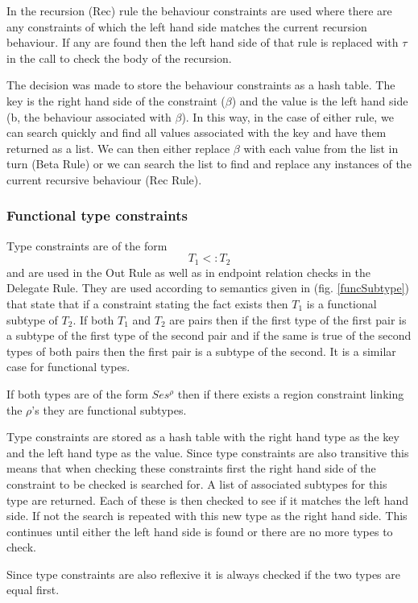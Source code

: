 In the recursion (Rec) rule the behaviour constraints are used where there are any constraints of which the left hand side matches the current recursion behaviour. If any are found then the left hand side of that rule is replaced with $\tau$ in the call to check the body of the recursion. 

The decision was made to store the behaviour constraints as a hash table. The key is the right hand side of the constraint ($\beta$) and the value is the left hand side (b, the behaviour associated with $\beta$). In this way, in the case of either rule, we can search quickly and find all values associated with the key and have them returned as a list. We can then either replace $\beta$ with each value from the list in turn (Beta Rule) or we can search the list to find and replace any instances of the current recursive behaviour (Rec Rule). 

\subsubsection{Functional type constraints}

Type constraints are of the form $$T_1 <: T_2$$ and are used in the Out Rule as well as in endpoint relation checks in the Delegate Rule. They are used according to semantics given in (fig. \ref{funcSubtype}) that state that if a constraint stating the fact exists then $T_1$ is a functional subtype of $T_2$. If both $T_1$ and $T_2$ are pairs then if the first type of the first pair is a subtype of the first type of the second pair and if the same is true of the second types of both pairs then the first pair is a subtype of the second. It is a similar case for functional types.

If both types are of the form $Ses^{\rho}$ then if there exists a region constraint linking the $\rho$'s  they are functional subtypes.

Type constraints are stored as a hash table with the right hand type as the key and the left hand type as the value. Since type constraints are also transitive this means that when checking these constraints first the right hand side of the constraint to be checked is searched for. A list of associated subtypes for this type are returned. Each of these is then checked to see if it matches the left hand side. If not the search is repeated with this new type as the right hand side. This continues until either the left hand side is found or there are no more types to check.

Since type constraints are also reflexive it is  always checked if the two types are equal first.

